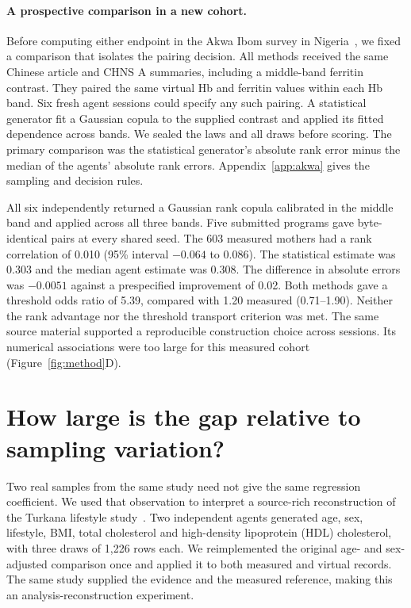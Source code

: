 \documentclass[sigconf,anonymous,review]{acmart}
\begin{document}
\paragraph{A prospective comparison in a new cohort.}
Before computing either endpoint in the Akwa Ibom survey in Nigeria~\cite{akwa_iron}, we fixed a comparison that isolates the pairing decision. All methods received the same Chinese article and CHNS A summaries, including a middle-band ferritin contrast. They paired the same virtual Hb and ferritin values within each Hb band. Six fresh agent sessions could specify any such pairing. A statistical generator fit a Gaussian copula to the supplied contrast and applied its fitted dependence across bands. We sealed the laws and all draws before scoring. The primary comparison was the statistical generator's absolute rank error minus the median of the agents' absolute rank errors. Appendix~\ref{app:akwa} gives the sampling and decision rules.

All six independently returned a Gaussian rank copula calibrated in the middle band and applied across all three bands. Five submitted programs gave byte-identical pairs at every shared seed. The 603 measured mothers had a rank correlation of 0.010 (95\% interval $-0.064$ to 0.086). The statistical estimate was 0.303 and the median agent estimate was 0.308. The difference in absolute errors was $-0.0051$ against a prespecified improvement of 0.02. Both methods gave a threshold odds ratio of 5.39, compared with 1.20 measured (0.71--1.90). Neither the rank advantage nor the threshold transport criterion was met. The same source material supported a reproducible construction choice across sessions. Its numerical associations were too large for this measured cohort (Figure~\ref{fig:method}D).


\section{How large is the gap relative to sampling variation?}
\label{sec:lifestyle}
Two real samples from the same study need not give the same regression coefficient. We used that observation to interpret a source-rich reconstruction of the Turkana lifestyle study~\cite{lea,leadata}. Two independent agents generated age, sex, lifestyle, BMI, total cholesterol and high-density lipoprotein (HDL) cholesterol, with three draws of 1,226 rows each. We reimplemented the original age- and sex-adjusted comparison once and applied it to both measured and virtual records. The same study supplied the evidence and the measured reference, making this an analysis-reconstruction experiment.
\end{document}
